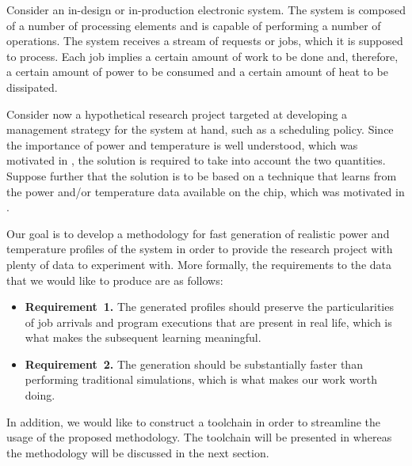 Consider an in-design or in-production electronic system. The system is composed
of a number of processing elements and is capable of performing a number of
operations. The system receives a stream of requests or jobs, which it is
supposed to process. Each job implies a certain amount of work to be done and,
therefore, a certain amount of power to be consumed and a certain amount of heat
to be dissipated.

Consider now a hypothetical research project targeted at developing a management
strategy for the system at hand, such as a scheduling policy. Since the
importance of power and temperature is well understood, which was motivated in
, the solution is required to take into account the two
quantities. Suppose further that the solution is to be based on a technique that
learns from the power and/or temperature data available on the chip, which was
motivated in .

Our goal is to develop a methodology for fast generation of realistic power and
temperature profiles of the system in order to provide the research project with
plenty of data to experiment with. More formally, the requirements to the data
that we would like to produce are as follows:

\begin{itemize}
  \item {\bfseries Requirement~1.} The generated profiles should preserve the
  particularities of job arrivals and program executions that are present in
  real life, which is what makes the subsequent learning meaningful.

  \item {\bfseries Requirement~2.} The generation should be substantially faster
  than performing traditional simulations, which is what makes our work worth
  doing.
\end{itemize}

In addition, we would like to construct a toolchain in order to streamline the
usage of the proposed methodology. The toolchain will be presented in
 whereas the methodology will be discussed in the next section.
